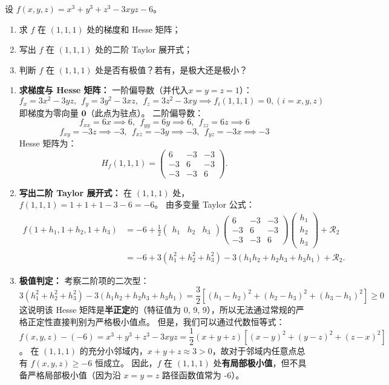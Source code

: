 \documentclass[lang=cn,11pt]{elegantbook}
\begin{document}
\begin{exercise}
设 $f(x,y,z)=x^3+y^3+z^3-3xyz-6$。
\begin{enumerate}
  \item[(1)] 求 $f$ 在 $(1,1,1)$ 处的梯度和 Hesse 矩阵；
  \item[(2)] 写出 $f$ 在 $(1,1,1)$ 处的二阶 Taylor 展开式；
  \item[(3)] 判断 $f$ 在 $(1,1,1)$ 处是否有极值？若有，是极大还是极小？
\end{enumerate}
\end{exercise}
\begin{solution}
\begin{enumerate}
  \item[(1)] \textbf{求梯度与 Hesse 矩阵：}
  一阶偏导数（并代入$x=y=z=1$）：
  \[f_x = 3x^2 - 3yz,~~f_y = 3y^2 - 3xz,~~f_z = 3z^2 - 3xy \implies f_i(1,1,1) = 0,(i=x,y,z)\]
  即梯度为零向量 $\boldsymbol{0}$（此点为驻点）。
  二阶偏导数：
  \[f_{xx} = 6x \implies 6,~~f_{yy} = 6y \implies 6,~~f_{zz} = 6z \implies 6\]
  \[f_{xy} = -3z \implies -3,~~f_{xz} = -3y \implies -3,~~f_{yz} = -3x \implies -3\]
  Hesse 矩阵为：
  \[
  H_f(1,1,1) = \begin{pmatrix} 6 & -3 & -3 \\ -3 & 6 & -3 \\ -3 & -3 & 6 \end{pmatrix}.
  \]

  \item[(2)] \textbf{写出二阶 Taylor 展开式：}
  在 $(1,1,1)$ 处，$f(1,1,1) = 1+1+1-3-6 = -6$。
  由多变量 Taylor 公式：
  \begin{align*}
  f(1+h_1, 1+h_2, 1+h_3) &= -6 + \frac{1}{2} \begin{pmatrix} h_1 & h_2 & h_3 \end{pmatrix} \begin{pmatrix} 6 & -3 & -3 \\ -3 & 6 & -3 \\ -3 & -3 & 6 \end{pmatrix} \begin{pmatrix} h_1 \\ h_2 \\ h_3 \end{pmatrix} + \mathcal{R}_2 \\
  &= -6 + 3(h_1^2+h_2^2+h_3^2) - 3(h_1h_2+h_2h_3+h_3h_1) + \mathcal{R}_2.
  \end{align*}

  \item[(3)] \textbf{极值判定：}
  考察二阶项的二次型：\[3(h_1^2+h_2^2+h_3^2) - 3(h_1h_2+h_2h_3+h_3h_1) = \dfrac{3}{2} \left[ (h_1-h_2)^2 + (h_2-h_3)^2 + (h_3-h_1)^2 \right] \geq 0\]
  这说明该 Hesse 矩阵是\textbf{半正定}的（特征值为 0, 9, 9），所以无法通过常规的严格正定性直接判别为严格极小值点。
  但是，我们可以通过代数恒等式：$f(x,y,z) - (-6) = x^3+y^3+z^3-3xyz = \dfrac{1}{2}(x+y+z)\left[ (x-y)^2+(y-z)^2+(z-x)^2 \right]$。
  在 $(1,1,1)$ 的充分小邻域内，$x+y+z \approx 3 > 0$，故对于邻域内任意点总有 $f(x,y,z) \geq -6$ 恒成立。
  因此，$f$ 在 $(1,1,1)$ 处\textbf{有局部极小值}，但不具备严格局部极小值（因为沿 $x=y=z$ 路径函数值常为 -6）。
\end{enumerate}
\end{solution}
\end{document}
